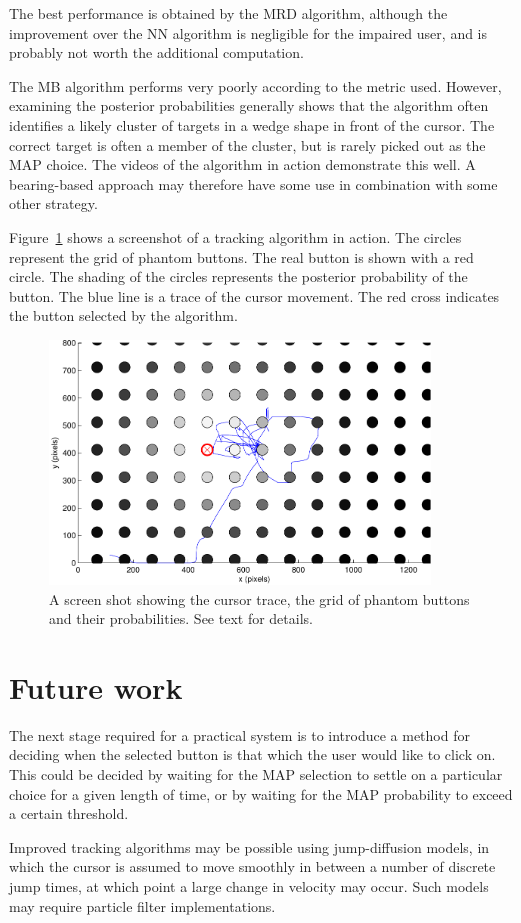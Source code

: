 The best performance is obtained by the MRD algorithm, although the improvement over the NN algorithm is negligible for the impaired user, and is probably not worth the additional computation.

The MB algorithm performs very poorly according to the metric used. However, examining the posterior probabilities generally shows that the algorithm often identifies a likely cluster of targets in a wedge shape in front of the cursor. The correct target is often a member of the cluster, but is rarely picked out as the MAP choice. The videos of the algorithm in action demonstrate this well. A bearing-based approach may therefore have some use in combination with some other strategy.

Figure~\ref{fig:CursorTracking} shows a screenshot of a tracking algorithm in action. The circles represent the grid of phantom buttons. The real button is shown with a red circle. The shading of the circles represents the posterior probability of the button. The blue line is a trace of the cursor movement. The red cross indicates the button selected by the algorithm.

\begin{figure}[hbt]
\centering \includegraphics[width=0.9\textwidth]{MovieScreenshot-crop.pdf}
\caption{A screen shot showing the cursor trace, the grid of phantom buttons and their probabilities. See text for details.}
\label{fig:CursorTracking}
\end{figure}



\section{Future work}
The next stage required for a practical system is to introduce a method for deciding when the selected button is that which the user would like to click on. This could be decided by waiting for the MAP selection to settle on a particular choice for a given length of time, or by waiting for the MAP probability to exceed a certain threshold.

Improved tracking algorithms may be possible using jump-diffusion models, in which the cursor is assumed to move smoothly in between a number of discrete jump times, at which point a large change in velocity may occur. Such models may require particle filter implementations.
